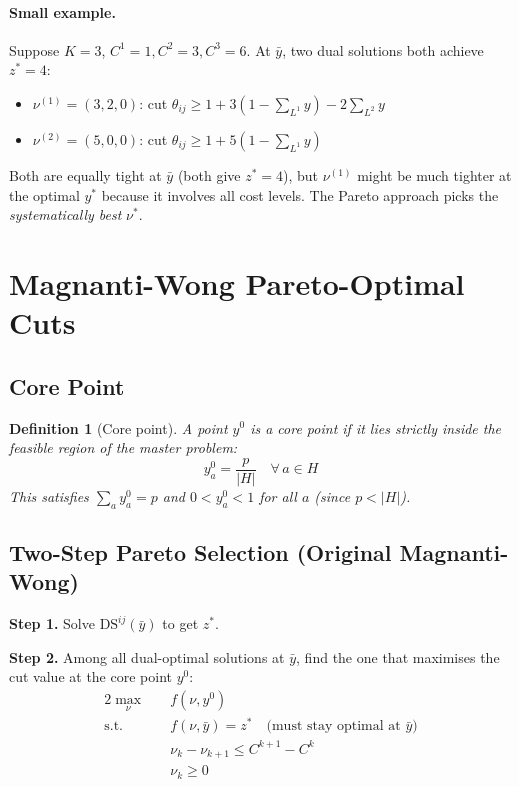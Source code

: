 \documentclass[12pt,a4paper]{article}
\newtheorem{definition}{Definition}
\begin{document}
\paragraph{Small example.} Suppose $K=3$, $C^1=1, C^2=3, C^3=6$.
At $\bar{y}$, two dual solutions both achieve $z^*=4$:
\begin{itemize}
  \item $\nu^{(1)} = (3, 2, 0)$: cut $\theta_{ij} \ge 1 + 3(1-\sum_{L^1}y) - 2\sum_{L^2}y$
  \item $\nu^{(2)} = (5, 0, 0)$: cut $\theta_{ij} \ge 1 + 5(1-\sum_{L^1}y)$
\end{itemize}
Both are equally tight at $\bar{y}$ (both give $z^*=4$), but $\nu^{(1)}$ might
be much tighter at the optimal $y^*$ because it involves all cost levels.
The Pareto approach picks the \emph{systematically best} $\nu^*$.

\section{Magnanti-Wong Pareto-Optimal Cuts}

\subsection{Core Point}

\begin{definition}[Core point]
A point $y^0$ is a \emph{core point} if it lies strictly inside the feasible region
of the master problem:
$$y^0_a = \frac{p}{|H|} \quad \forall\, a \in H$$
This satisfies $\sum_a y^0_a = p$ and $0 < y^0_a < 1$ for all $a$ (since $p < |H|$).
\end{definition}

\subsection{Two-Step Pareto Selection (Original Magnanti-Wong)}

\begin{tcolorbox}[colback=lightblue,title=\textbf{Pareto Dual} $\overline{\text{DS}}^{ij}(\bar{y}, y^0)$]
\textbf{Step 1.}  Solve $\text{DS}^{ij}(\bar{y})$ to get $z^*$.

\medskip
\textbf{Step 2.}  Among all dual-optimal solutions at $\bar{y}$, find the one
that maximises the cut value at the core point $y^0$:
\begin{alignat}{2}
\max_{\nu}\quad & f(\nu, y^0) \\
\text{s.t.}\quad & f(\nu, \bar{y}) = z^* \quad \text{(must stay optimal at $\bar{y}$)} \\
                 & \nu_k - \nu_{k+1} \le C^{k+1}-C^k \\
                 & \nu_k \ge 0
\end{alignat}
\end{tcolorbox}
\end{document}
